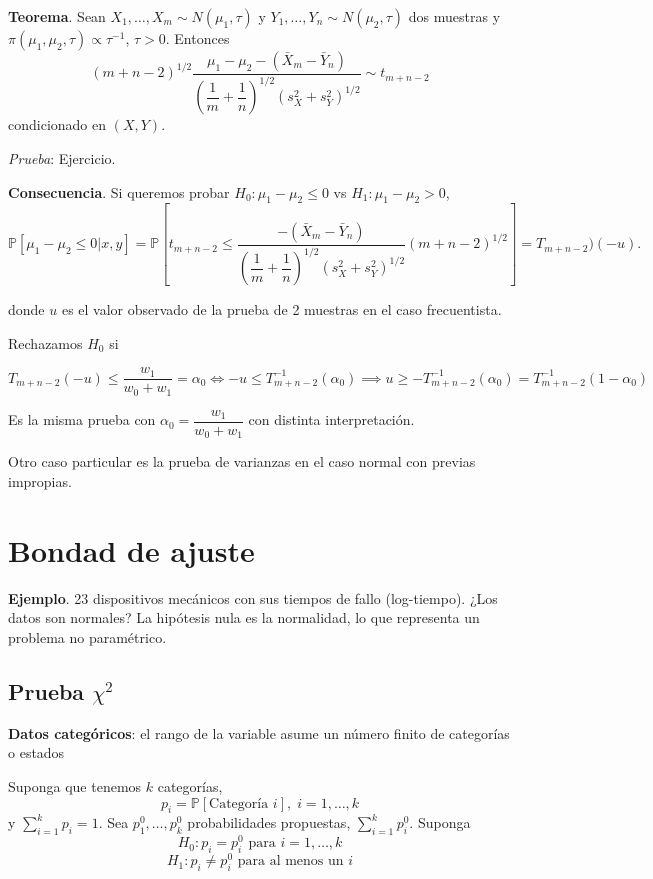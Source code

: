 \documentclass[
  12pt,
]{book}
\begin{document}
\textbf{Teorema}. Sean \(X_1,\dots,X_m\sim N(\mu_1,\tau)\) y \(Y_1,\dots, Y_n\sim N(\mu_2,\tau)\) dos muestras y \(\pi(\mu_1,\mu_2,\tau)\propto \tau^{-1}\), \(\tau > 0\). Entonces
\[(m+n-2)^{1/2}\dfrac{\mu_1-\mu_2-(\bar X_{m}-\bar Y_n)}{\left(\dfrac 1m + \dfrac 1n\right)^{1/2}(s_X^2+s_Y^2)^{1/2}}\sim t_{m+n-2}\]
condicionado en \((X,Y)\).

\emph{Prueba}: Ejercicio.

\textbf{Consecuencia}. Si queremos probar \(H_0: \mu_1-\mu_2\leq 0\) vs \(H_1:\mu_1-\mu_2>0\),
\[\mathbb P[\mu_1-\mu_2\leq 0|x,y] = \mathbb P\left[t_{m+n-2}\leq \dfrac{-(\bar X_m-\bar Y_n)}{\left(\dfrac 1m + \dfrac 1n\right)^{1/2}(s_X^2+s_Y^2)^{1/2}}(m+n-2)^{1/2}\right] = T_{m+n-2})(-u).\]

donde \(u\) es el valor observado de la prueba de 2 muestras en el caso frecuentista.

Rechazamos \(H_0\) si

\[ T_{m+n-2}(-u)\leq \dfrac{w_1}{w_0+w_1}=\alpha_0 \Leftrightarrow -u\leq T_{m+n-2}^{-1}(\alpha_0) \implies u\geq -T_{m+n-2}^{-1}(\alpha_0) = T_{m+n-2}^{-1}(1-\alpha_0)\]

Es la misma prueba con \(\alpha_0 = \dfrac{w_1}{w_0+w_1}\) con distinta interpretación.

Otro caso particular es la prueba de varianzas en el caso normal con previas impropias.

\hypertarget{bondad-de-ajuste}{%
\chapter{Bondad de ajuste}\label{bondad-de-ajuste}}

\textbf{Ejemplo}. 23 dispositivos mecánicos con sus tiempos de fallo (log-tiempo). ¿Los datos son normales? La hipótesis nula es la normalidad, lo que representa un problema no paramétrico.

\hypertarget{prueba-chi2}{%
\section{\texorpdfstring{Prueba \(\chi^2\)}{Prueba \textbackslash chi\^{}2}}\label{prueba-chi2}}

\textbf{Datos categóricos}: el rango de la variable asume un número finito de categorías o estados

Suponga que tenemos \(k\) categorías,
\[p_i = \mathbb P[\text{Categoría }i],\;i=1,\dotsc,k\]
y \(\sum_{i=1}^kp_i = 1\). Sea \(p_1^0,\dotsc,p_k^0\) probabilidades propuestas, \(\sum_{i=1}^kp_i^0\). Suponga
\[ H_0: p_i = p_i^0\text{ para } i=1,\dots,k\]
\[ H_1: p_i \ne p_i^0\text{ para al menos un }i\]
\end{document}
